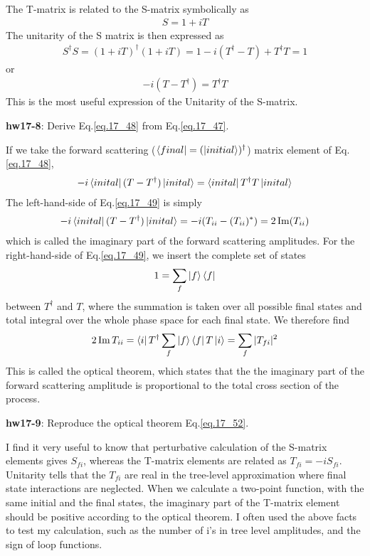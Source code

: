 \documentclass[12pt]{article}
\begin{document}
  The T-matrix is related to the S-matrix symbolically as
\begin{eqnarray}
  S = 1 + i T
\end{eqnarray}
  The unitarity of the S matrix is then expressed as
\begin{eqnarray}
  S^\dagger S = (1 + iT)^\dagger (1+iT)
                  = 1 -i(T^\dagger - T) + T^\dagger T
                  = 1 \label{eq.17_47}
\end{eqnarray}
  or
\begin{eqnarray}
  -i(T-T^\dagger) = T^\dagger T \label{eq.17_48}
\end{eqnarray}
  This is the most useful expression of the Unitarity of the S-matrix.

{\bf hw17-8}: Derive Eq.\ref{eq.17_48} from Eq.\ref{eq.17_47}.

  If we take the forward scattering ($\bra{final}= (\ket{initial})^\dagger$) matrix
  element of Eq.\ref{eq.17_48},
\begin{eqnarray}
  -i\bra{inital}(T-T^\dagger)\ket{inital} = \bra{inital}T^\dagger T\ket{inital} \label{eq.17_49}
\end{eqnarray}
  The left-hand-side of Eq.\ref{eq.17_49} is simply
\begin{eqnarray}
  -i\bra{inital}(T-T^\dagger)\ket{inital} = -i ( T_{ii} - (T_{ii})^* )
  = 2 \Im(T_{ii}) \label{eq.17_50}
\end{eqnarray}
  which is called the imaginary part of the forward scattering amplitudes.
  For the right-hand-side of Eq.\ref{eq.17_49}, we insert the complete set of states
\begin{eqnarray}
  1 = \sum_f \ket{f}\bra{f} \label{eq.17_51}
\end{eqnarray}
   between $T^\dagger$ and $T$, where the summation is taken over all possible
  final states and total integral over the whole phase space for each
  final state. We therefore find
\begin{eqnarray}
  2 \Im T_{ii} = \bra{i} T^\dagger \sum_f \ket{f}\bra{f} T \ket{i}
                  = \sum_f |T_{fi}|^2 \label{eq.17_52}
\end{eqnarray}
  This is called the optical theorem, which states that the the imaginary
  part of the forward scattering amplitude is proportional to the total
  cross section of the process.

{\bf hw17-9}: Reproduce the optical theorem Eq.\ref{eq.17_52}.

  I find it very useful to know that perturbative calculation of the
  S-matrix elements gives $S_{fi}$, whereas the T-matrix elements are
  related as $T_{fi} = -i S_{fi}$. Unitarity tells that the $T_{fi}$ are
  real in the tree-level approximation where final state interactions
  are neglected.  When we calculate a two-point function, with the same
  initial and the final states, the imaginary part of the T-matrix element
  should be positive according to the optical theorem.  I often used the
  above facts to test my calculation, such as the number of i's in tree
  level amplitudes, and the sign of loop functions.
\end{document}
